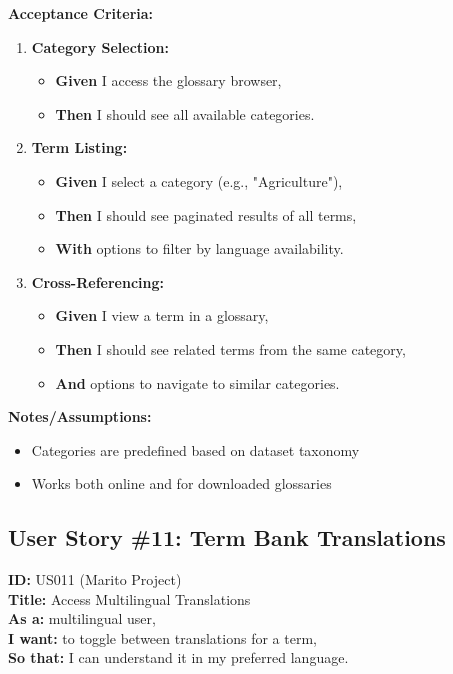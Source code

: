\documentclass[12pt]{article}
\begin{document}
\vspace{1em}
\textbf{Acceptance Criteria:}
\begin{enumerate}
    \item \textbf{Category Selection:}
    \begin{itemize}
        \item \textbf{Given} I access the glossary browser,
        \item \textbf{Then} I should see all available categories.
    \end{itemize}

    \item \textbf{Term Listing:}
    \begin{itemize}
        \item \textbf{Given} I select a category (e.g., "Agriculture"),
        \item \textbf{Then} I should see paginated results of all terms,
        \item \textbf{With} options to filter by language availability.
    \end{itemize}

    \item \textbf{Cross-Referencing:}
    \begin{itemize}
        \item \textbf{Given} I view a term in a glossary,
        \item \textbf{Then} I should see related terms from the same category,
        \item \textbf{And} options to navigate to similar categories.
    \end{itemize}
\end{enumerate}

\vspace{1em}
\textbf{Notes/Assumptions:}
\begin{itemize}
    \item Categories are predefined based on dataset taxonomy
    \item Works both online and for downloaded glossaries
\end{itemize}

\subsection{User Story \#11: Term Bank Translations}
\textbf{ID:} US011 (Marito Project) \\
\textbf{Title:} Access Multilingual Translations \\
\textbf{As a:} multilingual user, \\
\textbf{I want:} to toggle between translations for a term, \\
\textbf{So that:} I can understand it in my preferred language.
\end{document}
